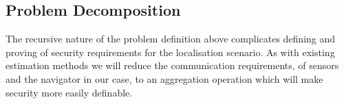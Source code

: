 \documentclass[twocolumn]{autart}
\begin{document}
% 
% 

\subsection{Problem Decomposition} \label{subsec:problem_decomposition}
The recursive nature of the problem definition above complicates defining and proving of security requirements for the localisation scenario. As with existing estimation methods \cite{benhamoudaNewFrameworkPrivacyPreserving2016,alexandruEncryptedCooperativeControl2019} we will reduce the communication requirements, of sensors and the navigator in our case, to an aggregation operation which will make security more easily definable. 
\end{document}
